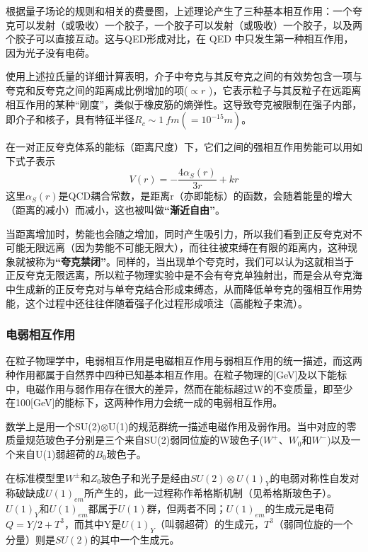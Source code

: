 根据量子场论的规则和相关的费曼图，上述理论产生了三种基本相互作用：一个夸克可以发射（或吸收）一个胶子，一个胶子可以发射（或吸收）一个胶子，以及两个胶子可以直接互动。这与QED形成对比，在 QED 中只发生第一种相互作用，因为光子没有电荷。

使用上述拉氏量的详细计算表明，介子中夸克与其反夸克之间的有效势包含一项与夸克和反夸克之间的距离成比例增加的项($\propto r$ )，它表示粒子与其反粒子在远距离相互作用的某种“刚度”，类似于橡皮筋的熵弹性。这导致夸克被限制在强子内部，即介子和核子，具有特征半径$R_c\sim\SI{1}{fm}(=10^{-15}\si{m})$。

在一对正反夸克体系的能标（距离尺度）下，它们之间的强相互作用势能可以用如下式子表示
\begin{equation}
    V(r)=-\frac{4\alpha_S(r)}{3r}+kr
\end{equation}
这里$\alpha_S(r)$是QCD耦合常数，是距离r（亦即能标）的函数，会随着能量的增大（距离的减小）而减小，这也被叫做\textbf{“渐近自由”}。

当距离增加时，势能也会随之增加，同时产生吸引力，所以我们看到正反夸克对不可能无限远离（因为势能不可能无限大），而往往被束缚在有限的距离内，这种现象就被称为\textbf{“夸克禁闭”}。同样的，当出现单个夸克时，我们可以认为这就相当于正反夸克无限远离，所以粒子物理实验中是不会有夸克单独射出，而是会从夸克海中生成新的正反夸克对与单夸克结合形成束缚态，从而降低单夸克的强相互作用势能，这个过程中还往往伴随着强子化过程形成喷注（高能粒子束流）。


\subsubsection{电弱相互作用}
在粒子物理学中，电弱相互作用是电磁相互作用与弱相互作用的统一描述，而这两种作用都属于自然界中四种已知基本相互作用。在粒子物理的[GeV]及以下能标中，电磁作用与弱作用存在很大的差异，然而在能标超过W的不变质量，即至少在100[GeV]的能标下，这两种作用力会统一成的电弱相互作用。

数学上是用一个SU(2)$\otimes$U(1)的规范群统一描述电磁作用及弱作用。当中对应的零质量规范玻色子分别是三个来自SU(2)弱同位旋的W玻色子($W^+$、$W_0$和$W^−$)以及一个来自U(1)弱超荷的$B_0$玻色子。

在标准模型里$W^±$和$Z_0$玻色子和光子是经由$SU(2)\otimes U(1)_Y$的电弱对称性自发对称破缺成$U(1)_{em}$所产生的，此一过程称作希格斯机制（见希格斯玻色子）。$U(1)_Y$和$U(1)_{em}$都属于$U(1)$群，但两者不同；$U(1)_{em}$的生成元是电荷$Q=Y/2+T^3$，而其中Y是$U(1)_Y$（叫弱超荷）的生成元，$T^3$（弱同位旋的一个分量）则是$SU(2)$的其中一个生成元。

